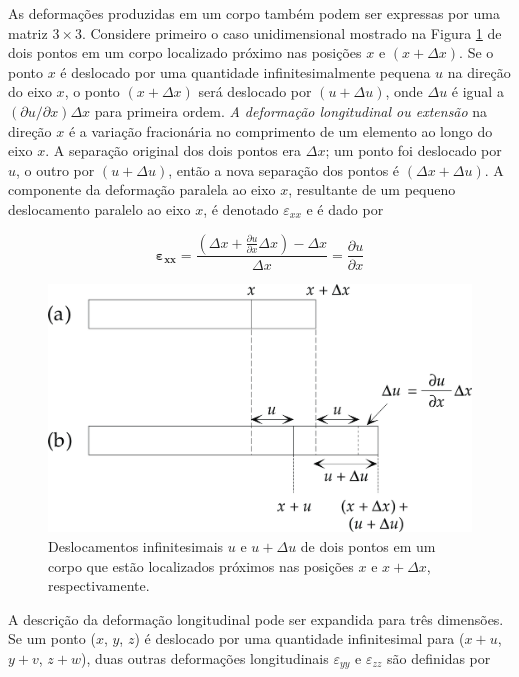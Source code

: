 \documentclass[]{book}
\theoremstyle{definition}
\theoremstyle{definition}
\theoremstyle{definition}
\theoremstyle{remark}
\begin{document}
As deformações produzidas em um corpo também podem ser expressas por uma matriz \(3\times 3\). Considere primeiro o caso unidimensional mostrado na Figura \ref{fig:desloc} de dois pontos em um corpo localizado próximo nas posições \(x\) e \((x+\Delta x)\). Se o ponto \(x\) é deslocado por uma quantidade infinitesimalmente pequena \(u\) na direção do eixo \(x\), o ponto \((x + \Delta x)\) será deslocado por \((u+\Delta u)\), onde \(\Delta u\) é igual a \((\partial u / \partial x) \Delta x\) para primeira ordem. \emph{A deformação longitudinal ou extensão} na direção \(x\) é a variação fracionária no comprimento de um elemento ao longo do eixo \(x\). A separação original dos dois pontos era \(\Delta x\); um ponto foi deslocado por \(u\), o outro por \((u+\Delta u)\), então a nova separação dos pontos é \((\Delta x + \Delta u)\). A componente da deformação paralela ao eixo \(x\), resultante de um pequeno deslocamento paralelo ao eixo \(x\), é denotado \(\varepsilon_{xx}\) e é dado por

\begin{equation}
\mathbf{\varepsilon_{xx}} = \frac{(\Delta {x} + \frac {\partial u}{\partial x}\Delta{x}) - \Delta{x}}{\Delta {x}} = \frac {\partial u}{\partial x}
\label{eq:0304}
\end{equation}

\begin{figure}

{\centering \includegraphics[width=0.7\linewidth]{fig/Fig_03.04} 

}

\caption{Deslocamentos infinitesimais $u$ e $u + \Delta u$ de dois pontos em um corpo que estão localizados próximos nas posições $x$ e $x + \Delta x$, respectivamente.}\label{fig:desloc}
\end{figure}

A descrição da deformação longitudinal pode ser expandida para três dimensões. Se um ponto (\(x\), \(y\), \(z\)) é deslocado por uma quantidade infinitesimal para (\(x + u\), \(y + v\), \(z + w\)), duas outras deformações longitudinais \(\varepsilon_{yy}\) e \(\varepsilon_{zz}\) são definidas por
\end{document}
